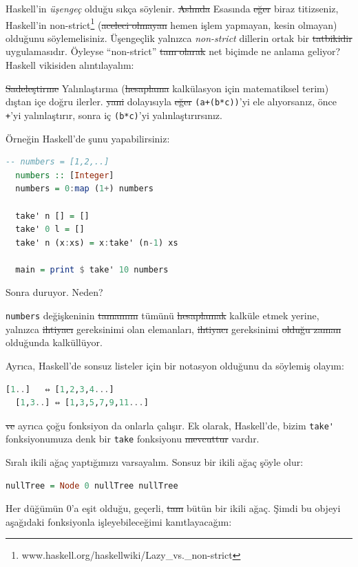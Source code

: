 \documentclass[a4paper,14pt,openany]{extbook} %
\let\emph\textit
\begin{document}
Haskell'in \emph{üşengeç} olduğu sıkça söylenir. \st{Aslında} Esasında \st{eğer} biraz titizseniz, Haskell'in
{\color{blue}non-strict}\footnote{www.haskell.org/haskellwiki/Lazy\_vs.\_non-strict}
(\st{aceleci olmayan} hemen işlem yapmayan, kesin olmayan) olduğunu söylemelisiniz. Üşengeçlik
yalnızca \emph{non-strict} dillerin ortak bir \st{tatbikidir} uygulamasıdır. Öyleyse ``non-strict'' \st{tam olarak} net biçimde ne anlama geliyor? Haskell vikisiden alıntılayalım:

\st{Sadeleştirme} Yalınlaştırma (\st{hesaplama} kalkülasyon için matematiksel terim) dıştan içe doğru ilerler. \st{yani} dolayısıyla \st{eğer} \lstinline!(a+(b*c))!'yi ele alıyorsanız, önce \lstinline!+!'yi yalınlaştırır, sonra iç \lstinline!(b*c)!'yi  yalınlaştırırsınız.

Örneğin Haskell'de şunu yapabilirsiniz:

\begin{lstlisting}[language=Haskell]
  -- numbers = [1,2,..]
  numbers :: [Integer]
  numbers = 0:map (1+) numbers

  take' n [] = []
  take' 0 l = []
  take' n (x:xs) = x:take' (n-1) xs

  main = print $ take' 10 numbers
\end{lstlisting}

Sonra duruyor. Neden?

\lstinline!numbers! değişkeninin \st{tamamını} tümünü \st{hesaplamak} kalküle etmek yerine, yalnızca
\st{ihtiyacı} gereksinimi olan elemanları, \st{ihtiyacı} gereksinimi \st{olduğu zaman} olduğunda kalküllüyor.

Ayrıca, Haskell'de sonsuz listeler için bir notasyon olduğunu da
söylemiş olayım:

\begin{lstlisting}[language=Haskell]
  [1..]   ⇔ [1,2,3,4...]
  [1,3..] ⇔ [1,3,5,7,9,11...]
\end{lstlisting}

\st{ve} ayrıca çoğu fonksiyon da onlarla çalışır. Ek olarak, Haskell'de, bizim
\lstinline!take'! fonksiyonumuza denk bir \lstinline!take! fonksiyonu
\st{mevcuttur} vardır.


Sıralı ikili ağaç yaptığımızı varsayalım. Sonsuz bir ikili ağaç şöyle
olur:

\begin{lstlisting}[language=Haskell]
  nullTree = Node 0 nullTree nullTree
\end{lstlisting}

Her düğümün 0'a eşit olduğu, geçerli, \st{tam} bütün bir ikili ağaç. Şimdi bu
objeyi aşağıdaki fonksiyonla işleyebileceğimi kanıtlayacağım:
\end{document}
